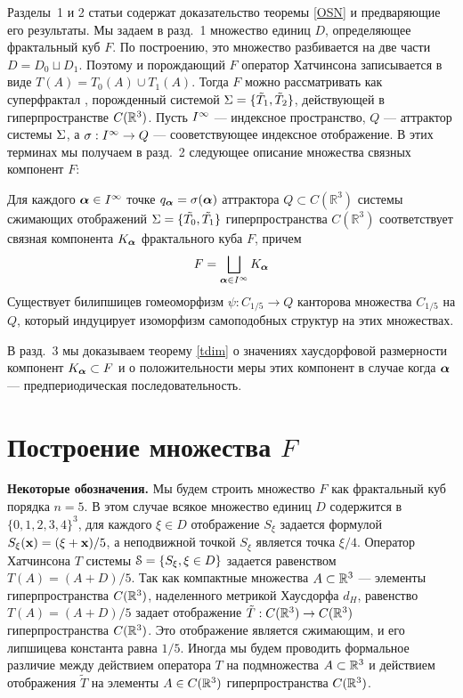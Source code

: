Разделы~1 и 2 статьи содержат доказательство теоремы \ref{OSN} и предваряющие его результаты. Мы задаем в разд.~1 множество единиц $D$, определяющее  фрактальный куб  $F$. По построению, это множество  разбивается на две части $ D= D_0\sqcup D_1$. Поэтому и порождающий $F$ оператор Хатчинсона записывается в виде $T(A)=T_0(A)\cup T_1(A)$.  Тогда $F$ можно рассматривать как суперфрактал \cite[Definition 18]{SF}, порожденный системой $\Sigma=\{\tilde T_1, \tilde T_2\}$, действующей в гиперпространстве $C(\mathbb{R}^3)$. Пусть $I^\infty$ --- индексное пространство,    $Q$ --- аттрактор системы $\Sigma$, а
  $\sigma:I^\infty\to Q$ --- сооветствующее  индексное отображение. В этих терминах
мы получаем в разд.~2 следующее описание множества связных компонент $F$:
\begin{theorem}\label{GGM}
 Для каждого ${\bm{\alpha}}\in I^\infty$   точке  $q_{\bm{\alpha}}=\sigma({\bm{\alpha}})$ аттрактора $Q\subset C(\mathbb{R}^3)$  системы сжимающих отображений $\Sigma=\{\tilde{T_0},\tilde{T_1}\}$ гиперпространства $C(\mathbb{R}^3)$ соответствует  связная компонента $K_{\bm{\alpha}}$ фрактального куба $F$,  причем $$F=\bigsqcup\limits_{{\bm{\alpha}}\in I^\infty} K_{\bm{\alpha}}$$ Существует билипшицев гомеоморфизм  $\psi: C_{1/5}\to Q$ канторова множества $C_{1/5}$ на $Q$, который индуцирует изоморфизм самоподобных структур на этих множествах.
\end{theorem}
В разд.~3 мы доказываем теорему \ref{tdim} о  значениях хаусдорфовой размерности компонент  $K_{\bm{\alpha}}\subset F$ и о положительности меры этих компонент  в случае когда ${\bm{\alpha}}$ --- предпериодическая последовательность.




\section{Построение множества $F$}

{\bf Некоторые обозначения.} Мы будем строить множество $F$ как фрактальный куб порядка $n=5$.
В этом случае всякое множество единиц $ D$ содержится в $\{0,1,2,3,4\}^3$, для каждого  $\xi\in D$ отображение $S_\xi$ задается  формулой  $S_\xi({\bf{x}})=(\xi+{\bf{x}})/5$, а неподвижной точкой $S_\xi$ является точка $\xi/4$.
Оператор Хатчинсона $T$ системы ${\EuScript S}=\{S_\xi, \xi\in D\}$ задается равенством $T(A)=(A+ D)/{5}$.
Так как компактные множества $A\subset\mathbb{R}^3$ --- элементы гиперпространства $C(\mathbb{R}^3)$, наделенного метрикой Хаусдорфа $d_H$, равенство $T(A)=(A+ D)/{5}$ задает  отображение ${\tilde T}:C(\mathbb{R}^3)\to C(\mathbb{R}^3)$ гиперпространства $C(\mathbb{R}^3)$. Это отображение является сжимающим, и его липшицева константа равна $1/5$. Иногда мы будем проводить формальное различие между действием оператора $T$ на подмножества $A\subset \mathbb{R}^3$  и действием отображения $\tilde T$ на элементы $A\in C(\mathbb{R}^3)$ гиперпространства $C(\mathbb{R}^3)$.\smallskip


